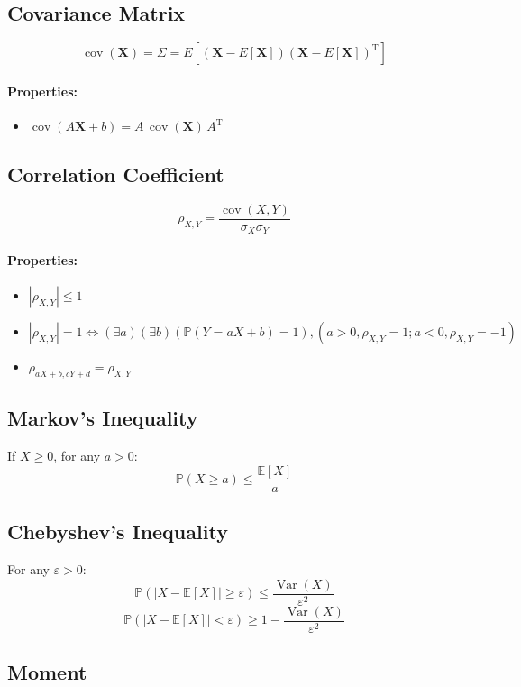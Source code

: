 \documentclass{article}
\begin{document}
\subsection{Covariance Matrix}
\[
    \operatorname{cov}(\mathbf{X}) = \Sigma = E[(\mathbf{X} - E[\mathbf{X}])(\mathbf{X} - E[\mathbf{X}])^{\mathrm{T}}]
\]
\paragraph{Properties:}
\begin{itemize}
    \item $\operatorname{cov}(A\mathbf{X} + b) = A \, \operatorname{cov}(\mathbf{X}) \, A^{\mathrm{T}}$
\end{itemize}

\subsection{Correlation Coefficient}
\[
    \rho_{X,Y} = \frac{\operatorname{cov}(X,Y)}{\sigma_X\sigma_Y}
\]
\paragraph{Properties:}
\begin{itemize}
    \item $ |\rho_{X,Y}| \le 1 $
    \item $ |\rho_{X,Y}| = 1 \Leftrightarrow (\exists a)(\exists b)(\mathbb{P}(Y=aX+b)=1), (a>0, \rho_{X,Y}=1; a<0, \rho_{X,Y}=-1) $
    \item $ \rho_{aX + b, cY + d} = \rho_{X,Y} $
\end{itemize}

\subsection{Markov's Inequality}
If $ X \geq 0 $, for any $ a > 0 $:
\[
    \mathbb{P}(X \geq a) \leq \frac{\mathbb{E}[X]}{a}
\]

\subsection{Chebyshev's Inequality}
For any $ \varepsilon > 0 $:
\[
    \mathbb{P}(|X-\mathbb{E}[X]| \ge \varepsilon) \le \frac{\operatorname{Var}(X)}{\varepsilon^2}
\]
\[
    \mathbb{P}(|X-\mathbb{E}[X]| < \varepsilon) \ge 1 - \frac{\operatorname{Var}(X)}{\varepsilon^2}
\]

\subsection{Moment}
\end{document}
